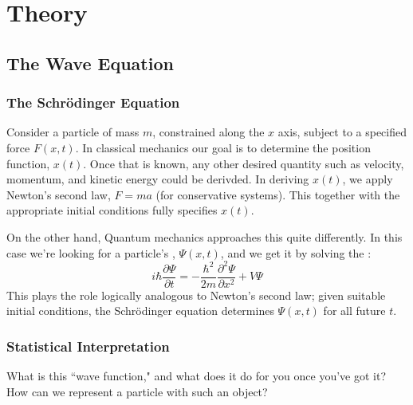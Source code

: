 \documentclass[12pt, a4paper, oneside, openright, titlepage]{book}
\begin{document}
\tableofcontents


\part{Theory}

\chapter{The Wave Equation}


\section{The Schr\"{o}dinger Equation}

Consider a particle of mass $m$, constrained along the $x$ axis, subject to a specified force $F(x,t)$. In classical mechanics our goal is to determine the position function, $x(t)$. Once that is known, any other desired quantity such as velocity, momentum, and kinetic energy could be derivded. In deriving $x(t)$, we apply Newton's second law, $F = ma$ (for conservative systems). This together with the appropriate initial conditions fully specifies $x(t)$.

On the other hand, Quantum mechanics approaches this quite differently. In this case we're looking for a particle's , $\Psi(x,t)$, and we get it by solving the : \begin{equation*}
    \boxed{i\hbar\frac{\partial \Psi}{\partial t} = -\frac{\hbar^2}{2m}\frac{\partial^2\Psi}{\partial x^2}+V\Psi}
\end{equation*}
This plays the role logically analogous to Newton's second law; given suitable initial conditions, the Schr\"{o}dinger equation determines $\Psi(x,t)$ for all future $t$.


\section{Statistical Interpretation}

\begin{qst}
    What is this ``wave function," and what does it do for you once you've got it? How can we represent a particle with such an object?
\end{qst}
\end{document}
